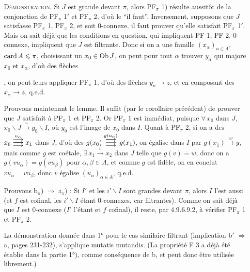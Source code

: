 \textsc{Démonstration}. Si $J$ est grande devant $\pi$, alors PF$_\pi$ 1) résulte aussitôt de la conjonction de PF$_\pi$ 1$'$ et PF$_\pi$ 2, d'où le “il faut”. Inversement, supposons que $J$ satisfasse PF$_\pi$ 1, PF$_\pi$ 2, et soit 0-connexe, il faut prouver qu'elle satisfait PF$_\pi$ 1$'$. Mais on sait déjà que les conditions en question, qui impliquent PF 1, PF 2, 0-connexe, impliquent que $J$ est filtrante. Donc si on a une famille $(x_\alpha)_{\alpha\in A}$, $\operatorname{card} A \leqslant \pi$, choisissant un $x_0 \in \operatorname{Ob} J$, on peut pour tout $\alpha$ trouver $y_\alpha$ qui majore $x_0$ et $x_\alpha$, d'où des flèches
, on peut leurs appliquer PF$_\pi$ 1, d'où des flèches $y_\alpha \longrightarrow z$, et en composant des $x_\alpha \longrightarrow z$, q.e.d. %

Prouvons maintenant le lemme. Il suffit (par le corollaire précédent) de prouver que $J$ satisfait à PF$_\pi$ 1 et PF$_\pi$ 2. Or PF$_\pi$ 1 est immédiat, puisque $\forall\, x_0$ dans $J$, $x_0\backslash J \xrightarrow{\ \sim\ } y_0\backslash I$, où $y_0$ est
l'image de $x_0$ dans $I$. Quant à PF$_\pi$ 2, si on a des $x_0 \trois{u_\alpha} x_1$ dans $J$, d'où des $g(x_0) \trois{g(u_\alpha)} g(x_1)$, on égalise dans $I$ par $g(x_1) \xrightarrow{w} y$, mais comme $g$ est coétale, $\exists\, x_1 \xrightarrow{v} x_2$ dans $J$ telle que $g(v) = w$, donc on a $g(vu_\alpha) = g(vu_\beta)$ pour $\alpha, \beta \in A$, et comme $g$ est fidèle, on en conclut $vu_\alpha = vu_\beta$, donc $v$ égalise $(u_\alpha)_{\alpha\in A}$, q.e.d.

Prouvons b$_\pi$) $\Longrightarrow$ a$_\pi$) : Si $I'$ et les $i'\backslash I$ sont grandes devant $\pi$, alors $I$ l'est aussi (et $f$ est cofinal, les $i'\backslash I$ étant 0-connexes, car filtrantes). Comme on sait déjà que $I$ est 0-connexe ($I'$ l'étant et $f$ cofinal), il reste, par 4.9.6.9.2, à vérifier PF$_\pi$ 1 et PF$_\pi$ 2.

La démonstration donnée dans 1° pour le cas similaire filtrant (implication b$'$ $\Longrightarrow$ a, pages 231-232), s'applique mutatis mutandis. (La propriété F 3 a déjà été établie dans la partie 1°), comme conséquence de b, et peut donc être utilisée librement.)

